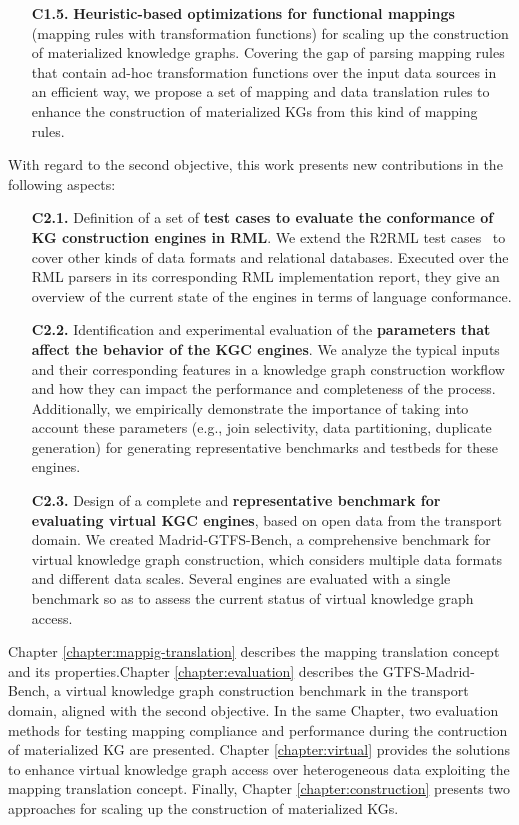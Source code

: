 \begin{enumerate}
    \item[\textbf{C1.5.}] \textbf{Heuristic-based optimizations for functional mappings} (mapping rules with transformation functions) for scaling up the construction of materialized knowledge graphs. Covering the gap of parsing mapping rules that contain ad-hoc transformation functions over the input data sources in an efficient way, we propose a set of mapping and data translation rules to enhance the construction of materialized KGs from this kind of mapping rules.
\end{enumerate}

With regard to the second objective, this work presents new contributions in the following aspects:
\begin{enumerate}
    \item[\textbf{C2.1.}] Definition of a set of \textbf{test cases to evaluate the conformance of KG construction engines in RML}. We extend the R2RML test cases~\citep{R2RML_test_cases} to cover other kinds of data formats and relational databases. Executed over the RML parsers in its corresponding RML implementation report, they give an overview of the current state of the engines in terms of language conformance.
    \item[\textbf{C2.2.}] Identification and experimental evaluation of the \textbf{parameters that affect the behavior of the KGC engines}. We analyze the typical inputs and their corresponding features in a knowledge graph construction workflow and how they can impact the performance and completeness of the process. Additionally, we empirically demonstrate the importance of taking into account these parameters (e.g., join selectivity, data partitioning, duplicate generation) for generating representative benchmarks and testbeds for these engines.
    \item[\textbf{C2.3.}] Design of a complete and \textbf{representative benchmark for evaluating virtual KGC engines}, based on open data from the transport domain. We created Madrid-GTFS-Bench, a comprehensive benchmark for virtual knowledge graph construction, which considers multiple data formats and different data scales. Several engines are evaluated with a single benchmark so as to assess the current status of virtual knowledge graph access.
\end{enumerate}

Chapter \ref{chapter:mappig-translation} describes the mapping translation concept and its properties.Chapter \ref{chapter:evaluation} describes the GTFS-Madrid-Bench, a virtual knowledge graph construction benchmark in the transport domain, aligned with the second objective. In the same Chapter, two evaluation methods for testing mapping compliance and performance during the contruction of materialized KG are presented. Chapter \ref{chapter:virtual} provides the solutions to enhance virtual knowledge graph access over heterogeneous data exploiting the mapping translation concept. Finally, Chapter \ref{chapter:construction} presents two approaches for scaling up the construction of materialized KGs. 

